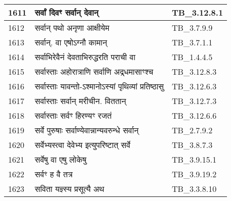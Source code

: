 \documentclass[17pt]{extarticle}
\begin{document}
\begin{longtable}{||p{0.4in}||p{4.9in}||p{0.9in}||}
    1611 & सर्वां दिवꣳ सर्वान् देवान् & TB\_3.12.8.1       \\
    
    \hline
        
    1612 & सर्वान् पथो अनृणा आक्षीयेम & TB\_3.7.9.9       \\
    
    \hline
        
    1613 & सर्वान्. वा एषोऽग्नौ कामान् & TB\_3.7.1.1       \\
    
    \hline
        
    1614 & सर्वाभिरेवैनं देवताभिरुद्धरति पराची वा & TB\_1.4.4.5       \\
    
    \hline
        
    1615 & सर्वास्ताः अहोरात्राणि सर्वाणि अद्र्धमासाꣳश्च & TB\_3.12.8.3       \\
    
    \hline
        
    1616 & सर्वास्ताः यावन्तो{-}ऽश्मानोऽस्यां पृथिव्यां प्रतिष्ठासु & TB\_3.12.6.3       \\
    
    \hline
        
    1617 & सर्वास्ताः सर्वान् मरीचीन. विततान् & TB\_3.12.7.3       \\
    
    \hline
        
    1618 & सर्वास्ताः सर्वꣳ हिरण्यꣳ रजतं & TB\_3.12.6.6       \\
    
    \hline
        
    1619 & सर्वे पुरुषाः सर्वाण्येवान्नान्यवरुन्धे सर्वान् & TB\_2.7.9.2       \\
    
    \hline
        
    1620 & सर्वेभ्यस्त्वा देवेभ्य इत्युपरिष्टात् सर्वे & TB\_3.8.7.3       \\
    
    \hline
        
    1621 & सर्वेषु वा एषु लोकेषु & TB\_3.9.15.1       \\
    
    \hline
        
    1622 & सर्वꣳ ह वै तत्र & TB\_3.9.19.2       \\
    
    \hline
        
    1623 & सविता यज्ञ्स्य प्रसूत्यै अथ & TB\_3.3.8.10       \\
    

\end{longtable}
\end{document}
